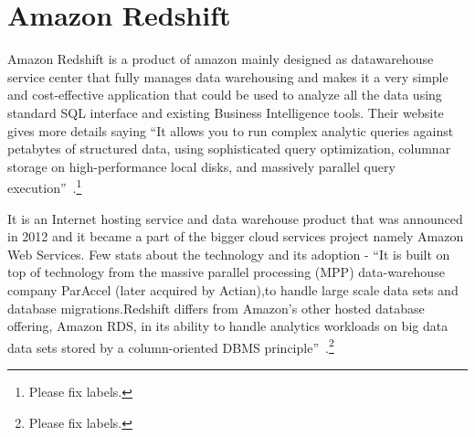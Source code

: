 \section{Amazon Redshift}

Amazon Redshift is a product of amazon mainly designed as
datawarehouse service center that fully manages data warehousing and
makes it a very simple and cost-effective application that could be
used to analyze all the data using standard SQL interface and existing
Business Intelligence tools.  Their website gives more details saying
``It allows you to run complex analytic queries against petabytes of
structured data, using sophisticated query optimization, columnar
storage on high-performance local disks, and massively parallel query
execution''~\cite{Amazon Redshift}.\footnote{Please fix labels.}

It is an Internet hosting service and data warehouse product that was
announced in 2012 and it became a part of the bigger cloud services
project namely Amazon Web Services. Few stats about the technology and
its adoption - ``It is built on top of technology from the massive
parallel processing (MPP) data-warehouse company ParAccel (later
acquired by Actian),to handle large scale data sets and database
migrations.Redshift differs from Amazon's other hosted database
offering, Amazon RDS, in its ability to handle analytics workloads on
big data data sets stored by a column-oriented DBMS
principle''~\cite{AmazonWiki}.\footnote{Please fix labels.}

